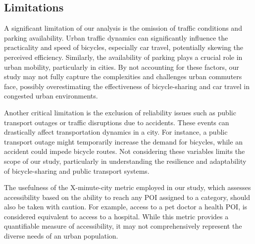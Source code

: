 
\subsection{Limitations}
\label{sec:limitations}



A significant limitation of our analysis is the omission of traffic conditions and parking availability. 
Urban traffic dynamics can significantly influence the practicality and speed of bicycles, especially car travel, potentially skewing the perceived efficiency.
Similarly, the availability of parking plays a crucial role in urban mobility, particularly in cities.
By not accounting for these factors, our study may not fully capture the complexities and challenges urban commuters face, possibly overestimating the effectiveness of bicycle-sharing and car travel in congested urban environments.

Another critical limitation is the exclusion of reliability issues such as public transport outages or traffic disruptions due to accidents. 
These events can drastically affect transportation dynamics in a city. 
For instance, a public transport outage might temporarily increase the demand for bicycles, while an accident could impede bicycle routes. 
Not considering these variables limits the scope of our study, particularly in understanding the resilience and adaptability of bicycle-sharing and public transport systems.

The usefulness of the X-minute-city metric employed in our study, which assesses accessibility based on the ability to reach any POI assigned to a category, should also be taken with caution.
For example, access to a pet doctor a health POI, is considered equivalent to access to a hospital.
While this metric provides a quantifiable measure of accessibility, it may not comprehensively represent the diverse needs of an urban population. 


